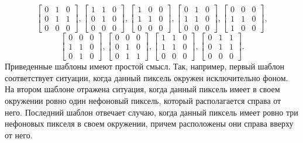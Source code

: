\documentclass[a4paper,12pt,russian]{article} %
\begin{document}
$$
	\begin{bmatrix}
		0 & 1 & 0 \\
		0 & 1 & 1 \\
		0 & 0 & 0
	\end{bmatrix},
	\begin{bmatrix}
		1 & 1 & 0 \\
		0 & 1 & 0 \\
		0 & 0 & 0
	\end{bmatrix},
	\begin{bmatrix}
		1 & 0 & 0 \\
		1 & 1 & 0 \\
		0 & 0 & 0
	\end{bmatrix},
	\begin{bmatrix}
		0 & 1 & 0 \\
		1 & 1 & 0 \\
		0 & 0 & 0
	\end{bmatrix},
	\begin{bmatrix}
		0 & 0 & 0 \\
		1 & 1 & 0 \\
		1 & 0 & 0
	\end{bmatrix},
$$
$$
	\begin{bmatrix}
		0 & 0 & 0 \\
		1 & 1 & 0 \\
		0 & 1 & 0
	\end{bmatrix},
	\begin{bmatrix}
		0 & 0 & 0 \\
		0 & 1 & 0 \\
		0 & 1 & 1
	\end{bmatrix},
	\begin{bmatrix}
		1 & 1 & 0 \\
		1 & 1 & 0 \\
		0 & 0 & 0
	\end{bmatrix},
	\begin{bmatrix}
		0 & 1 & 1 \\
		0 & 1 & 1 \\
		0 & 0 & 0
	\end{bmatrix}.
$$
Приведенные шаблоны имеют простой смысл.
Так, например, первый шаблон соответствует ситуации, когда данный пиксель окружен исключительно фоном.
На втором шаблоне отражена ситуация, когда данный пиксель имеет в своем окружении ровно один нефоновый пиксель, который располагается справа от него.
Последний шаблон отвечает случаю, когда данный пиксель имеет ровно три нефоновых пикселя в своем окружении, причем расположены они справа вверху от него.
\end{document}

